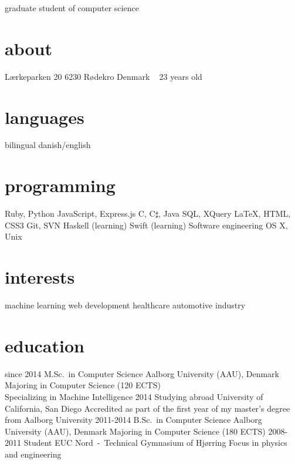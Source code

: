 \documentclass{afriggeri-cv/friggeri-cv}
\newcommand{\aau}{%
  Aalborg University (AAU), Denmark
}
\begin{document}
       {graduate student of computer science}

\begin{aside}
  \section{about}
    Lærkeparken 20
    6230 Rødekro
    Denmark
    ~
    23 years old
  \section{languages}
    bilingual danish/english
  \section{programming}
    Ruby, Python
    JavaScript, Express.js
    C, C$\sharp$, Java
    SQL, XQuery
    \LaTeX, HTML, CSS3
    Git, SVN
    Haskell (learning)
    Swift (learning)
    Software engineering
    OS X, Unix
  \section{interests}
    machine learning
    web development
    healthcare
    automotive industry
\end{aside}

\section{education}

\begin{entrylist}
  \entry
    {since 2014}
    {M.Sc.\ {\normalfont in Computer Science}}
    {\aau}
    {Majoring in Computer Science (120 ECTS)\\
    Specializing in Machine Intelligence}
  \entry
    {2014}
    {Studying abroad}
    {University of California, San Diego}
    {Accredited as part of the first year of my master's degree from Aalborg University}
  \entry
    {2011-2014}
    {B.Sc.\ {\normalfont in Computer Science}}
    {\aau}
    {Majoring in Computer Science (180 ECTS)}
  \entry
    {2008-2011}
    {Student}
    {EUC Nord~-~Technical Gymnasium of Hjørring}
    {Focus in physics and engineering}
\end{entrylist}
\end{document}
